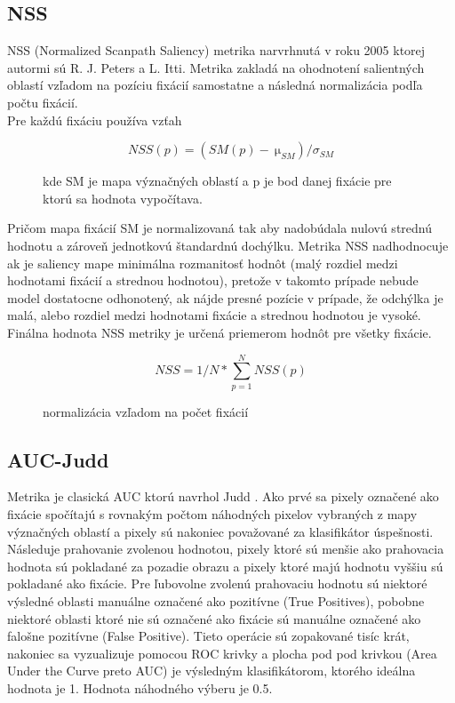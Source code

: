 \subsection{NSS}
NSS (Normalized Scanpath Saliency) metrika narvrhnutá v roku 2005 ktorej autormi sú R. J. Peters a L. Itti. Metrika zakladá na ohodnotení salientných oblastí vzľadom na pozíciu fixácií samostatne a následná normalizácia podľa počtu fixácií. \\
Pre každú fixáciu používa vzťah

\begin{figure}[H]
  \begin{equation}
    NSS(p) =  (SM(p)-\SI{}{\micro}_{SM}) / 	\sigma_{SM}
  \end{equation}
  \caption{kde SM je mapa význačných oblastí a p je bod danej fixácie pre ktorú sa hodnota vypočítava.}
  \vspace{10mm}
\end{figure}

Pričom mapa fixácií SM je normalizovaná tak aby nadobúdala nulovú strednú hodnotu a zároveň jednotkovú štandardnú dochýlku. Metrika NSS nadhodnocuje ak je saliency mape minimálna rozmanitosť hodnôt (malý rozdiel medzi hodnotami fixácií a strednou hodnotou), pretože v takomto prípade nebude model dostatocne odhonotený, ak nájde presné pozície v prípade, že odchýlka je malá, alebo
rozdiel medzi hodnotami fixácie a strednou hodnotou je vysoké. Finálna hodnota NSS metriky je určená priemerom hodnôt pre všetky fixácie\cite{metrics-1}.

\begin{figure}[H]
  \begin{equation}
    NSS = 1/N * \sum_{p=1}^{N}NSS(p)
  \end{equation}
  \caption{normalizácia vzľadom na počet fixácií}
  \vspace{10mm}
\end{figure}

\subsection{AUC-Judd}
Metrika je clasická AUC ktorú navrhol Judd \cite{auc-judd}. Ako prvé sa pixely označené ako fixácie spočítajú s rovnakým počtom náhodných pixelov vybraných z mapy význačných oblastí a pixely sú nakoniec považované za klasifikátor úspešnosti. Následuje prahovanie zvolenou hodnotou, pixely ktoré sú menšie ako prahovacia hodnota sú pokladané za pozadie obrazu a pixely ktoré majú hodnotu vyššiu sú pokladané ako fixácie. Pre ľubovolne zvolenú prahovaciu hodnotu sú niektoré výsledné oblasti manuálne označené ako pozitívne (True Positives), pobobne niektoré oblasti ktoré nie sú označené ako fixácie sú manuálne označené ako falošne pozitívne (False Positive). Tieto operácie sú zopakované tisíc krát, nakoniec sa vyzualizuje pomocou ROC krivky a plocha pod pod krivkou (Area Under the Curve preto AUC) je výsledným klasifikátorom, ktorého ideálna hodnota je 1. Hodnota náhodného výberu je 0.5.

